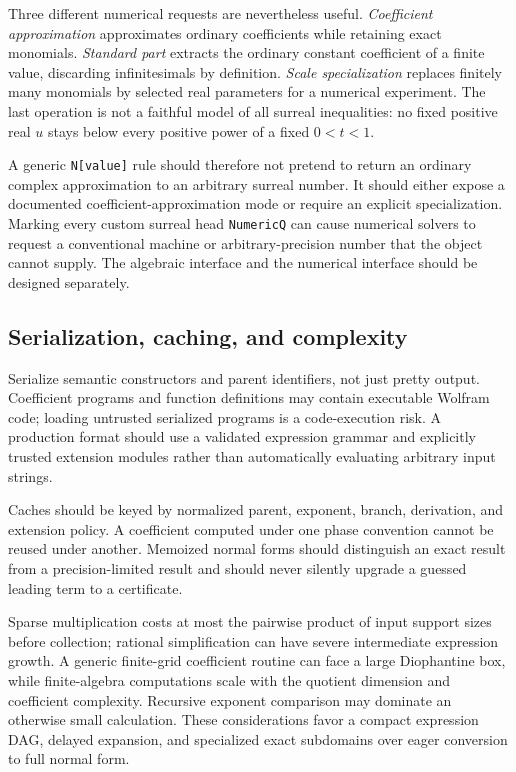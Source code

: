 \documentclass[11pt,letterpaper]{article}
\theoremstyle{definition}\newtheorem{definition}[theorem]{Definition}
\theoremstyle{remark}\newtheorem{remark}[theorem]{Remark}
\newcommand{\code}[1]{\texttt{#1}}
\numberwithin{equation}{section}\setcounter{tocdepth}{2}
\begin{document}
Three different numerical requests are nevertheless useful. \emph{Coefficient approximation} approximates ordinary coefficients while retaining exact monomials. \emph{Standard part} extracts the ordinary constant coefficient of a finite value, discarding infinitesimals by definition. \emph{Scale specialization} replaces finitely many monomials by selected real parameters for a numerical experiment. The last operation is not a faithful model of all surreal inequalities: no fixed positive real $u$ stays below every positive power of a fixed $0<t<1$.

A generic \code{N[value]} rule should therefore not pretend to return an ordinary complex approximation to an arbitrary surreal number. It should either expose a documented coefficient-approximation mode or require an explicit specialization. Marking every custom surreal head \code{NumericQ} can cause numerical solvers to request a conventional machine or arbitrary-precision number that the object cannot supply. The algebraic interface and the numerical interface should be designed separately.

\subsection{Serialization, caching, and complexity}
Serialize semantic constructors and parent identifiers, not just pretty output. Coefficient programs and function definitions may contain executable Wolfram code; loading untrusted serialized programs is a code-execution risk. A production format should use a validated expression grammar and explicitly trusted extension modules rather than automatically evaluating arbitrary input strings.

Caches should be keyed by normalized parent, exponent, branch, derivation, and extension policy. A coefficient computed under one phase convention cannot be reused under another. Memoized normal forms should distinguish an exact result from a precision-limited result and should never silently upgrade a guessed leading term to a certificate.

Sparse multiplication costs at most the pairwise product of input support sizes before collection; rational simplification can have severe intermediate expression growth. A generic finite-grid coefficient routine can face a large Diophantine box, while finite-algebra computations scale with the quotient dimension and coefficient complexity. Recursive exponent comparison may dominate an otherwise small calculation. These considerations favor a compact expression DAG, delayed expansion, and specialized exact subdomains over eager conversion to full normal form.
\end{document}
